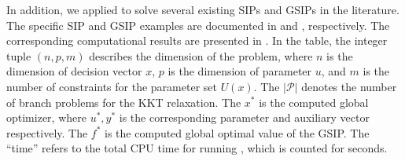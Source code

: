 \documentclass{amsart}
\theoremstyle{plain}
\newcommand{\mc}[1]{\mathcal{#1}}
\numberwithin{equation}{section}
\begin{document}
		
		
		
		
		In addition, we applied  to solve several existing SIPs and GSIPs in the literature. 
		The specific SIP and GSIP examples are documented in  and , respectively. The corresponding computational results are presented in .
		In the table, the integer tuple $(n,p,m)$ describes the dimension of the problem,
		where $n$ is the dimension of decision vector $x$, $p$ is the dimension of parameter $u$,
		and $m$ is the number of constraints for the parameter set $U(x)$.
		The $|\mc{P}|$ denotes the number of branch problems for the KKT relaxation. 
		The $x^*$ is the computed global optimizer, where $u^*, y^*$ is the corresponding 
		parameter and auxiliary vector respectively. 
		The $f^*$ is the computed global optimal value of the GSIP.
		The ``time'' refers to the total CPU time for running ,
		which is counted for seconds.
\end{document}

